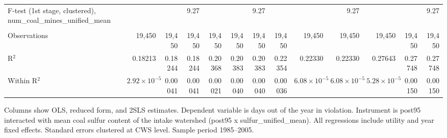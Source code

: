 \begin{table}[htbp]
\begin{adjustbox}{width = \textwidth, center}
\begin{tabular}{lrrrrrrrrrrrr}
         F-test (1st stage, clustered), num\_coal\_mines\_unified\_mean     &                       &               & 9.27      &          &               & 9.27      &          &                       & 9.27                  &                       &               & 9.27\\  
         
          \\
         
         Observations                                                       & 19,450                & 19,450        & 19,450    & 19,450   & 19,450        & 19,450    & 19,450   & 19,450                & 19,450                & 19,450                & 19,450        & 19,450\\  
         R$^2$                                                              & 0.18213               & 0.18244       & 0.18244   & 0.20368  & 0.20383       & 0.20383   & 0.22354  & 0.22330               & 0.22330               & 0.27643               & 0.27748       & 0.27748\\  
         Within R$^2$                                                       & $2.92\times 10^{-5}$  & 0.00041       & 0.00041   & 0.00021  & 0.00040       & 0.00040   & 0.00036  & $6.08\times 10^{-5}$  & $6.08\times 10^{-5}$  & $5.28\times 10^{-5}$  & 0.00150       & 0.00150\\  
         
         \bottomrule
         
      \end{tabular}
      
      
      
   \end{adjustbox}
      {\tiny\linespread{1}\selectfont \par \raggedright 
   Columns show OLS, reduced form, and 2SLS estimates. Dependent variable is days out of the year in violation. Instrument is post95 interacted with mean coal sulfur content of the intake watershed (post95 x sulfur\_unified\_mean). All regressions include utility and year fixed effects. Standard errors clustered at CWS level. Sample period 1985--2005.}
   
\end{table}


